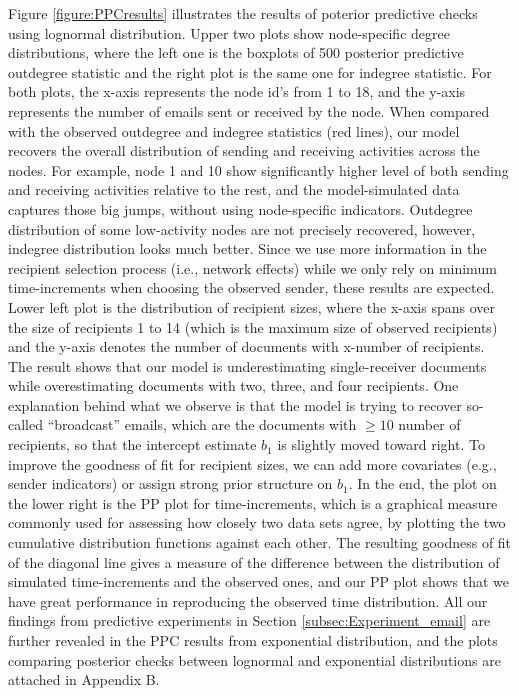 \documentclass[ba]{imsart}
\numberwithin{equation}{section}
\theoremstyle{plain}
\begin{document}
	Figure \ref{figure:PPCresults} illustrates the results of poterior predictive checks using lognormal distribution. Upper two plots show node-specific degree distributions, where the left one is the boxplots of 500 posterior predictive outdegree statistic and the right plot is the same one for indegree statistic. For both plots, the x-axis represents the node id's from 1 to 18, and the y-axis represents the number of emails sent or received by the node. When compared with the observed outdegree and indegree statistics (red lines), our model recovers the overall distribution of sending and receiving activities across the nodes. For example, node 1 and 10 show significantly higher level of both sending and receiving activities relative to the rest, and the model-simulated data captures those big jumps, without using node-specific indicators. Outdegree distribution of some low-activity nodes are not precisely recovered, however, indegree distribution looks much better. Since we use more information in the recipient selection process (i.e., network effects) while we only rely on minimum time-increments when choosing the observed sender, these results are expected. Lower left plot is the distribution of recipient sizes, where the x-axis spans over the size of recipients 1 to 14 (which is the maximum size of observed recipients) and the y-axis denotes the number of documents with x-number of recipients. The result shows that our model is underestimating single-receiver documents while overestimating documents with two, three, and four recipients. One explanation behind what we observe is that the model is trying to recover so-called ``broadcast'' emails, which are the documents with $\geq 10$ number of recipients, so that the intercept estimate $b_1$ is slightly moved toward right. To improve the goodness of fit for recipient sizes, we can add more covariates (e.g., sender indicators) or assign strong prior structure on $b_1$. In the end, the plot on the lower right is the PP plot for time-increments, which is a graphical measure commonly used for assessing how closely two data sets agree, by plotting the two cumulative distribution functions against each other. The resulting goodness of fit of the diagonal line gives a measure of the difference between the distribution of simulated time-increments and the observed ones, and our PP plot shows that we have great performance in reproducing the observed time distribution. All our findings from predictive experiments in Section \ref{subsec:Experiment_email} are further revealed in the PPC results from exponential distribution, and the plots comparing posterior checks between lognormal and exponential distributions are attached in Appendix B.
	
\end{document}
